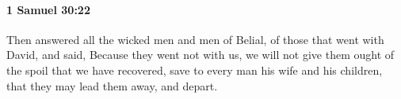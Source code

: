 
		\paragraph{1 Samuel 30:22} %
			\label{1SAMUEL-30-22}

			Then answered all the wicked men and men of Belial, of those that went with David, and said, Because they went not with us, we will not give them ought of the spoil that we have recovered, save to every man his wife and his children, that they may lead them away, and depart.



